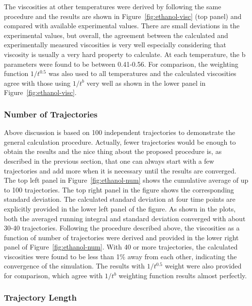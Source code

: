 \documentclass[12pt]{article}
\begin{document}
The viscosities at other temperatures were derived by following the same procedure
and the results are shown in Figure~\ref{fig:ethanol-visc} (top panel) and compared with available experimental values.
There are small deviations in the experimental values,
but overall,
the agreement between the calculated and experimentally measured viscosities is very well
especially considering that viscosity is usually a very hard property to calculate.
At each temperature,
the b parameters were found to be between 0.41-0.56.
For comparison, the weighting function $1/t^{0.5}$ was also used to all temperatures 
and the calculated viscosities agree with those using $1/t^b$ very well
as shown in the lower panel in Figure~\ref{fig:ethanol-visc}.

\subsubsection{Number of Trajectories}

Above discussion is based on 100 independent trajectories to demonstrate the general calculation procedure.
Actually, fewer trajectories would be enough to obtain the results
and the nice thing about the proposed procedure is,
as described in the previous section,
that one can always start with a few trajectories and add more when it is necessary until the results are converged.
The top left panel in Figure~\ref{fig:ethanol-num} shows the cumulative average of up to 100 trajectories.
The top right panel in the figure shows the corresponding standard deviation.
The calculated standard deviation at four time points are explicitly provided in the lower left panel of the figure.
As shown in the plots,
both the averaged running integral and standard deviation converged with about 30-40 trajectories.
Following the procedure described above,
the viscosities as a function of number of trajectories were derived 
and provided in the lower right panel of Figure~\ref{fig:ethanol-num}.
With 40 or more trajectories,
the calculated viscosities were found to be less than 1\% away from each other,
indicating the convergence of the simulation.
The results with $1/t^{0.5}$ weight were also provided for comparison,
which agree with $1/t^b$ weighting function results almost perfectly.

\subsubsection{Trajectory Length}
\end{document}

